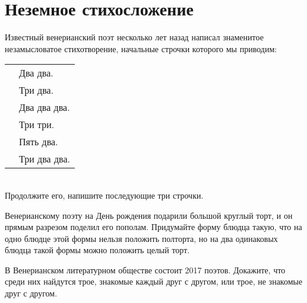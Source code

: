 \section{Неземное стихосложение}
\begin{itemize}

\itA Известный венерианский поэт несколько лет назад написал знаменитое незамысловатое стихотворение, начальные строчки которого мы приводим: \\
\begin{tabular}{p{1.7cm}l}
& Два два. \\
& Три два. \\
& Два два два. \\
& Три три. \\
& Пять два. \\
& Три два два.
\end{tabular} \\
Продолжите его, напишите последующие три строчки.

\itB Венерианскому поэту на День рождения подарили большой круглый торт, и он прямым разрезом поделил его пополам. Придумайте форму блюдца такую, что на одно блюдце этой формы нельзя положить полторта, но на два одинаковых блюдца такой формы можно положить целый торт.

\itC В Венерианском литературном обществе состоит 2017 поэтов. Докажите, что среди них найдутся трое, знакомые каждый друг с другом, или трое, не знакомые друг с другом.
\end{itemize}
